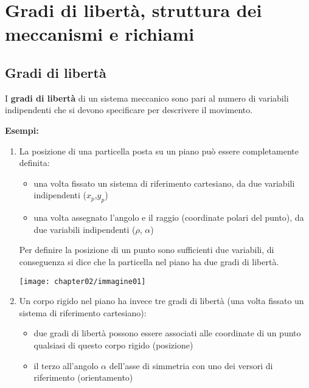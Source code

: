 \chapter{Gradi di libertà, struttura dei meccanismi e richiami}

	\section{Gradi di libertà}
		I \textbf{gradi di libertà} di un sistema meccanico sono pari al numero di variabili indipendenti che si devono specificare per descrivere il movimento.

		\vspace{0.5cm}
		\textbf{Esempi:}
			\begin{enumerate}

				\item La posizione di una particella posta su un piano può essere completamente definita:

					\begin{minipage}{.475\textwidth}
						\begin{itemize}
							\item una volta fissato un sistema di riferimento cartesiano, da due variabili indipendenti ($x_p$,$ y_p$)
							\item una volta assegnato l'angolo e il raggio (coordinate polari del punto), da due variabili indipendenti ($\rho$, $\alpha$)
						\end{itemize}
		
						Per definire la posizione di un punto sono sufficienti due variabili, di conseguenza si dice che la particella nel piano ha due gradi di libertà.
					\end{minipage}
					\hfill
					\begin{minipage}{.475\textwidth}
						\centering
						\texttt{[image: chapter02/immagine01]} 
					\end{minipage}

				\vspace{3mm}
				\item Un corpo rigido nel piano ha invece tre gradi di libertà (una volta fissato un sistema di riferimento cartesiano):
				
					\begin{minipage}{.475\textwidth}
						\begin{itemize}
							\item due gradi di libertà possono essere associati alle coordinate di un punto qualsiasi di questo corpo rigido (posizione)
							\item il terzo all'angolo $\alpha$ dell'asse di simmetria con uno dei versori di riferimento (orientamento)
						\end{itemize}


\end{minipage}
\end{enumerate}
